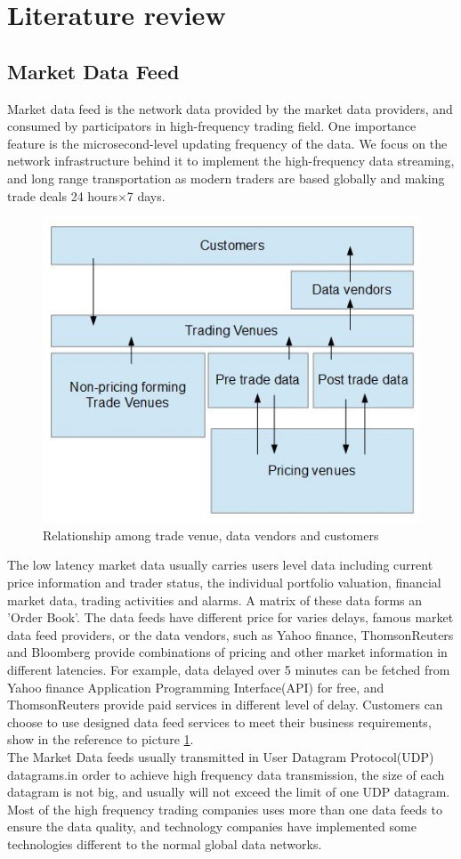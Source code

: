 \documentclass[11pt,openright,a4paper]{report}
\begin{document}
\section{Literature review}
\subsection{Market Data Feed}
Market data feed is the network data provided by the market data providers, and consumed by participators in high-frequency trading field. One importance feature is the microsecond-level updating frequency of the data. We focus on the network infrastructure behind it to implement the high-frequency data streaming, and long range transportation as modern traders are based globally and making trade deals 24 hours$\times$7 days\cite{chlistalla2011high}.\\
\begin{figure}[H] 
	\centering\includegraphics[width=0.7\linewidth]{picture/tradevenue.PNG} 
	\caption{Relationship among trade venue, data vendors and customers}
	\label{fig:1} 
\end{figure} 
The low latency market data usually carries users level data including current price information and trader status, the individual portfolio valuation, financial market data, trading activities and alarms. A matrix of these data forms an 'Order Book'\cite{menkveld2013high}. The data feeds have different price for varies delays, famous market data feed providers, or the data vendors, such as Yahoo finance, ThomsonReuters and Bloomberg provide combinations of pricing and other market information in different latencies\cite{hasbrouck2013low}. For example, data delayed over 5 minutes can be fetched from Yahoo finance Application Programming Interface(API) for free\cite{financeyahoo}, and ThomsonReuters provide paid services in different level of delay. Customers can choose to use designed data feed services to meet their business requirements, show in the reference to picture \ref{fig:1}.\\
The Market Data feeds usually transmitted in User Datagram Protocol(UDP) datagrams\cite{brook2015low}.in order to achieve high frequency data transmission, the size of each datagram is not big, and usually will not exceed the limit of one UDP datagram.\\
Most of the high frequency trading companies uses more than one data feeds to ensure the data quality, and technology companies have implemented some technologies different to the normal global data networks.\\
\end{document}
